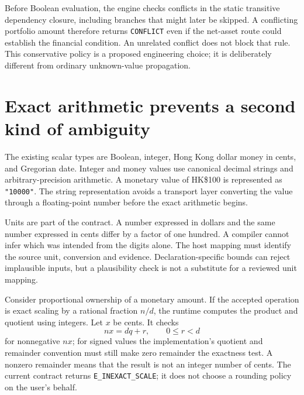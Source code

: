 
Before Boolean evaluation, the engine checks conflicts in the static transitive
dependency closure, including branches that might later be skipped. A conflicting
portfolio amount therefore returns \texttt{CONFLICT} even if the net-asset route
could establish the financial condition. An unrelated conflict does not block
that rule. This conservative policy is a proposed engineering choice; it is
deliberately different from ordinary unknown-value propagation.

\section{Exact arithmetic prevents a second kind of ambiguity}
\label{merge:M07:02}


The existing scalar types are Boolean, integer, Hong Kong dollar money in cents,
and Gregorian date. Integer and money values use canonical decimal strings and
arbitrary-precision arithmetic. A monetary value of HK\$100 is represented as
\texttt{"10000"}. The string representation avoids a transport layer converting
the value through a floating-point number before the exact arithmetic begins.

Units are part of the contract. A number expressed in dollars and the same number
expressed in cents differ by a factor of one hundred. A compiler cannot infer
which was intended from the digits alone. The host mapping must identify the
source unit, conversion and evidence. Declaration-specific bounds can reject
implausible inputs, but a plausibility check is not a substitute for a reviewed
unit mapping.

Consider proportional ownership of a monetary amount. If the accepted operation
is exact scaling by a rational fraction $n/d$, the runtime computes the product
and quotient using integers. Let $x$ be cents. It checks
\begin{equation}
 nx=dq+r,\qquad 0\leq r<d
 \label{eq:exact-scale}
\end{equation}
for nonnegative $nx$; for signed values the implementation's quotient and
remainder convention must still make zero remainder the exactness test. A
nonzero remainder means that the result is not an integer number of cents. The
current contract returns \texttt{E\_INEXACT\_SCALE}; it does not choose a rounding
policy on the user's behalf.

